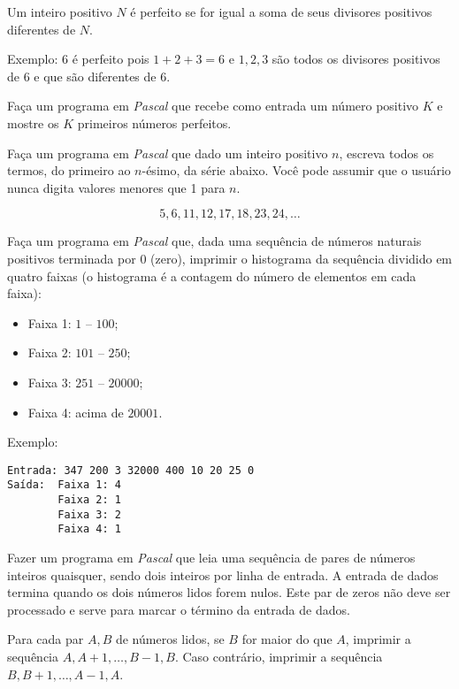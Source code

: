 
\item Um inteiro positivo $N$ é perfeito se for igual a soma de seus
divisores positivos diferentes de $N$.

Exemplo: 6 é perfeito pois $1 + 2 + 3 = 6$ e $1, 2, 3$ são todos os
divisores positivos de 6 e que são diferentes de 6.

Faça um programa em \emph{Pascal} que recebe como entrada um número
positivo $K$ e mostre os $K$ primeiros números perfeitos.


\item Faça um  programa em \emph{Pascal} que dado um inteiro positivo $n$, escreva
todos os termos, do primeiro ao $n$-ésimo, da série abaixo.  Você pode
assumir que o usuário nunca digita valores menores que 1 para $n$.

\[ 5,6,11,12,17,18,23,24, \ldots\]


\item Faça um programa em \emph{Pascal} que, dada uma sequência de números naturais positivos terminada por $0$ (zero), imprimir o histograma da sequência dividido em quatro faixas (o histograma é a contagem do número de elementos em cada faixa):
\begin{itemize}
 \item Faixa 1: $1$ -- $100$;
 \item Faixa 2: $101$ -- $250$;
 \item Faixa 3: $251$ -- $20000$;
 \item Faixa 4: acima de $20001$.
\end{itemize}

Exemplo:
\begin{verbatim}
Entrada: 347 200 3 32000 400 10 20 25 0
Saída:  Faixa 1: 4
        Faixa 2: 1
        Faixa 3: 2
        Faixa 4: 1
\end{verbatim}


\item Fazer um programa em \emph{Pascal} que leia uma sequência de
 pares de números inteiros quaisquer, sendo dois inteiros por linha de
entrada. A entrada de dados termina quando os dois números lidos forem nulos.
Este par de zeros não deve ser processado e serve para marcar o
término da entrada de dados.

Para cada par $A,B$ de números lidos, se $B$ for maior do que
$A$, imprimir a sequência $A,A+1, \ldots, B-1,B$. Caso contrário,
imprimir a sequência $B,B+1, \ldots,A-1,A$.

